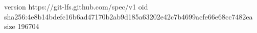 version https://git-lfs.github.com/spec/v1
oid sha256:4e8b14bdefc16b6ad47170b2ab9d185a63202e42c7b4699acfe66e68cc7482ea
size 196704
